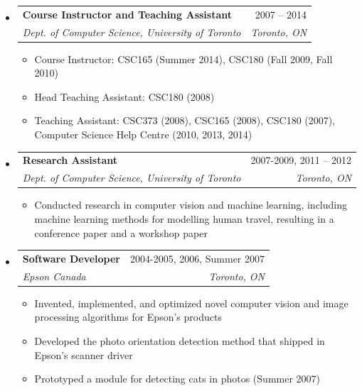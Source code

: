\documentclass[letterpaper,11pt]{article}
\makeatletter
\newcommand{\ressubheading}[4]{
\begin{tabular*}{\linewidth}[t]{l@{\extracolsep{\fill}}r}
		\textbf{#1} & #2 \\
		\textit{\textcolor{accent}{#3}} & \textit{#4} \\
\end{tabular*}\vspace{-2pt}}
\makeatother
\begin{document}
\begin{itemize}
	\begin{itemize}
		\item Conducted research in computer vision and participated in a technology transfer project, developing computer vision algorithms for feature point localization on 3D objects and applying Histogram-of-Gradients-based object detection to the PASCAL Challenge dataset and the industrial partner's dataset
	\end{itemize}
\item
	\ressubheading{Course Instructor and Teaching Assistant}{2007 -- 2014}{Dept. of Computer Science, University of Toronto}{Toronto, ON}
	\begin{itemize}
		\item Course Instructor: CSC165 (Summer 2014), CSC180 (Fall 2009, Fall 2010)
		\item Head Teaching Assistant: CSC180 (2008)
		\item Teaching Assistant: CSC373 (2008), CSC165 (2008), CSC180 (2007), Computer Science Help Centre (2010, 2013, 2014)
	\end{itemize}
\item
	\ressubheading{Research Assistant}{2007-2009, 2011 -- 2012}{Dept. of Computer Science, University of Toronto}{Toronto, ON}
	\begin{itemize}
		\item Conducted research in computer vision and machine learning, including machine learning methods for modelling human travel, resulting in a conference paper and a workshop paper
	\end{itemize}
\item
	\ressubheading{Software Developer}{2004-2005, 2006, Summer 2007}{Epson Canada}{Toronto, ON}
	\begin{itemize}
		\item Invented, implemented, and optimized novel computer vision and image processing algorithms for Epson's products
		\item Developed the photo orientation detection method that shipped in Epson's scanner driver
		\item Prototyped a module for detecting cats in photos (Summer 2007)
	\end{itemize}
\end{itemize}
\end{document}
